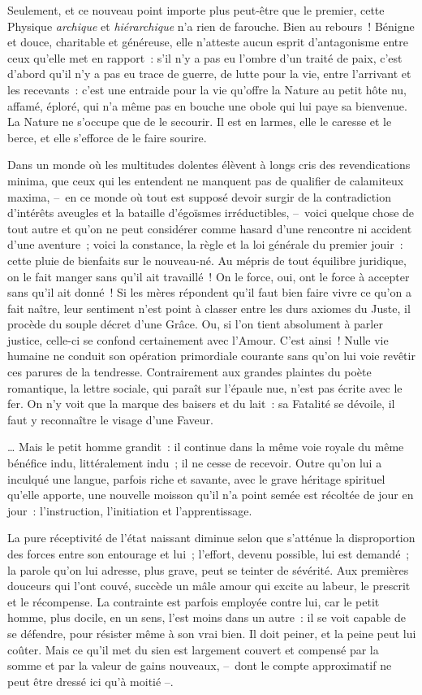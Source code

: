 \documentclass[french,twoside]{book} %
\begin{document}
Seulement, et ce nouveau point importe plus peut-être que le premier, cette Physique \emph{archique} et \emph{hiérarchique} n’a rien de farouche. Bien au rebours ! Bénigne et douce, charitable et généreuse, elle n’atteste aucun esprit d’antagonisme entre ceux qu’elle met en rapport : s’il n’y a pas eu l’ombre d’un traité de paix, c’est d’abord qu’il n’y a pas eu trace de guerre, de lutte pour la vie, entre l’arrivant et les recevants : c’est une entraide pour la vie qu’offre la Nature au petit hôte nu, affamé, éploré, qui n’a même pas en bouche une obole qui lui paye sa bienvenue. La Nature ne s’occupe que de le secourir. Il est en larmes, elle le caresse et le berce, et elle s’efforce de le faire sourire.\par
Dans un monde où les multitudes dolentes élèvent à longs cris des revendications minima, que ceux qui les entendent ne manquent pas de qualifier de calamiteux maxima, – en ce monde où tout est supposé devoir surgir de la contradiction d’intérêts aveugles et la bataille d’égoïsmes irréductibles, – voici quelque chose de tout autre et qu’on ne peut considérer comme hasard d’une rencontre ni accident d’une aventure ; voici la constance, la règle et la loi générale du premier jouir : cette pluie de bienfaits sur le nouveau-né. Au mépris de tout équilibre juridique, on le fait manger sans qu’il ait travaillé ! On le force, oui, ont le force à accepter sans qu’il ait donné ! Si les mères répondent qu’il faut bien faire vivre ce qu’on a fait naître, leur sentiment n’est point à classer entre les durs axiomes du Juste, il procède du souple décret d’une Grâce. Ou, si l’on tient absolument à parler justice, celle-ci se confond certainement avec l’Amour. C’est ainsi ! Nulle vie humaine ne conduit son opération primordiale courante sans qu’on lui voie revêtir ces parures de la tendresse. Contrairement aux grandes plaintes du poète romantique, la lettre sociale, qui paraît sur l’épaule nue, n’est pas écrite avec le fer. On n’y voit que la marque des baisers et du lait : sa Fatalité se dévoile, il faut y reconnaître le visage d’une Faveur.\par
… Mais le petit homme grandit : il continue dans la même voie royale du même bénéfice indu, littéralement indu ; il ne cesse de recevoir. Outre qu’on lui a inculqué une langue, parfois riche et savante, avec le grave héritage spirituel qu’elle apporte, une nouvelle moisson qu’il n’a point semée est récoltée de jour en jour : l’instruction, l’initiation et l’apprentissage.\par
La pure réceptivité de l’état naissant diminue selon que s’atténue la disproportion des forces entre son entourage et lui ; l’effort, devenu possible, lui est demandé ; la parole qu’on lui adresse, plus grave, peut se teinter de sévérité. Aux premières douceurs qui l’ont couvé, succède un mâle amour qui excite au labeur, le prescrit et le récompense. La contrainte est parfois employée contre lui, car le petit homme, plus docile, en un sens, l’est moins dans un autre : il se voit capable de se défendre, pour résister même à son vrai bien. Il doit peiner, et la peine peut lui coûter. Mais ce qu’il met du sien est largement couvert et compensé par la somme et par la valeur de gains nouveaux, – dont le compte approximatif ne peut être dressé ici qu’à moitié –.\par
\end{document}
